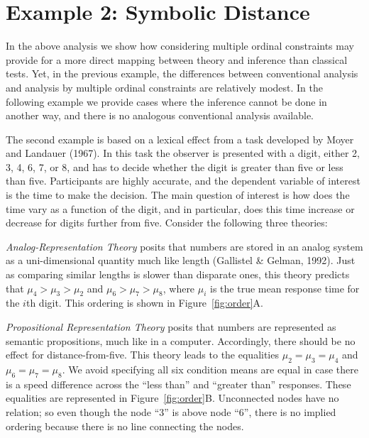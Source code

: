 \documentclass[english,,man]{apa6}
\begin{document}
\hypertarget{example-2-symbolic-distance}{%
\section{Example 2: Symbolic Distance}\label{example-2-symbolic-distance}}

In the above analysis we show how considering multiple ordinal constraints may provide for a more direct mapping between theory and inference than classical tests. Yet, in the previous example, the differences between conventional analysis and analysis by multiple ordinal constraints are relatively modest. In the following example we provide cases where the inference cannot be done in another way, and there is no analogous conventional analysis available.

The second example is based on a lexical effect from a task developed by Moyer and Landauer (1967). In this task the observer is presented with a digit, either 2, 3, 4, 6, 7, or 8, and has to decide whether the digit is greater than five or less than five. Participants are highly accurate, and the dependent variable of interest is the time to make the decision. The main question of interest is how does the time vary as a function of the digit, and in particular, does this time increase or decrease for digits further from five. Consider the following three theories:

\emph{Analog-Representation Theory} posits that numbers are stored in an analog system as a uni-dimensional quantity much like length (Gallistel \& Gelman, 1992). Just as comparing similar lengths is slower than disparate ones, this theory predicts that \(\mu_4>\mu_3>\mu_2\) and \(\mu_6>\mu_7>\mu_8\), where \(\mu_i\) is the true mean response time for the \(i\)th digit. This ordering is shown in Figure~\ref{fig:order}A.

\emph{Propositional Representation Theory} posits that numbers are represented as semantic propositions, much like in a computer. Accordingly, there should be no effect for distance-from-five. This theory leads to the equalities \(\mu_2=\mu_3=\mu_4\) and \(\mu_6=\mu_7=\mu_8\). We avoid specifying all six condition means are equal in case there is a speed difference across the \enquote{less than} and \enquote{greater than} responses. These equalities are represented in Figure~\ref{fig:order}B. Unconnected nodes have no relation; so even though the node \enquote{3} is above node \enquote{6}, there is no implied ordering because there is no line connecting the nodes.
\end{document}

